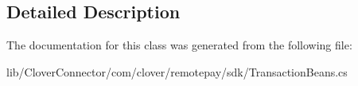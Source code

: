 \subsection{Detailed Description}




The documentation for this class was generated from the following file\+:\begin{DoxyCompactItemize}
\item 
lib/\+Clover\+Connector/com/clover/remotepay/sdk/Transaction\+Beans.\+cs\end{DoxyCompactItemize}
